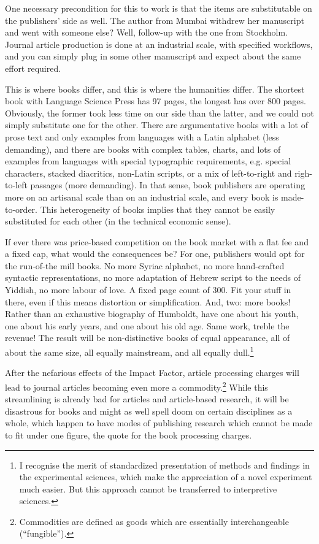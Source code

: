 \documentclass[12pt]{article}
\begin{document}
 One necessary precondition for this to work is that the items are substitutable on the publishers' side as well. The author from Mumbai withdrew her manuscript and went with someone else? Well, follow-up with the one from Stockholm. Journal article production is done at an industrial scale, with specified workflows, and you can simply plug in some other manuscript and expect about the same effort required. 
 
 This is where books differ, and this is where the humanities differ. The shortest book with Language Science Press has 97 pages, the longest has over 800 pages. Obviously, the former took less time on our side than the latter, and we could not simply substitute one for the other. There are argumentative books with a lot of prose text and only examples from languages with a Latin alphabet (less demanding), and there are books with complex tables, charts, and lots of examples from languages with special typographic requirements, e.g. special characters, stacked diacritics, non-Latin scripts, or a mix of left-to-right and righ-to-left passages (more demanding). In that sense, book publishers are operating more on an artisanal scale than on an industrial scale, and every book is made-to-order. This heterogeneity of books implies that they cannot be easily substituted for each other (in the technical economic sense).
 
 If ever there was price-based competition on the book market with a flat fee and a fixed cap, what would the consequences be? For one, publishers would opt for the run-of-the mill books. No more  Syriac alphabet, 
 no more hand-crafted syntactic representations, no more adaptation of Hebrew script to the needs of Yiddish, no more labour of love. A fixed page count of 300. Fit your stuff in there, even if this means distortion or simplification. And, two: more books! Rather than an exhaustive biography of Humboldt, have one about his youth, one about his early years, and one about his old age. Same work, treble the revenue! The result will be non-distinctive books of equal appearance, all of about the same size, all equally mainstream, and all equally dull.\footnote{I recognise the merit of standardized presentation of methods and findings in the experimental sciences, which make the appreciation of a novel experiment much easier. But this approach cannot be transferred to interpretive sciences.}
 
 After the nefarious effects of the Impact Factor, article processing charges will lead to journal articles becoming even more a commodity.\footnote{Commodities are defined as  goods which are essentially interchangeable (``fungible'').} While this streamlining is already bad for articles and article-based research, it will be disastrous for books and might as well spell doom on certain disciplines as a whole, which happen to have modes of publishing research which cannot be made to fit under one figure, the quote for the book processing charges. 
 
\end{document}
